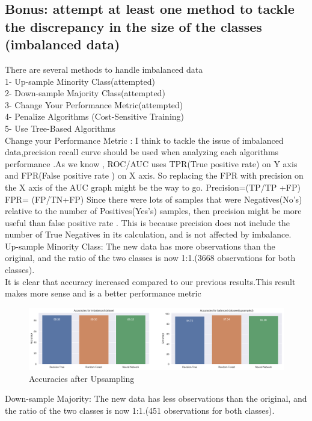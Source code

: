 \subsection{Bonus: attempt at least one method to tackle the discrepancy in the size of the classes (imbalanced data)}
There are several methods to handle imbalanced data\cite{ref_url2}\\
1- Up-sample Minority Class(attempted)\\
2- Down-sample Majority Class(attempted)\\
3- Change Your Performance Metric(attempted)\\
4- Penalize Algorithms (Cost-Sensitive Training)\\
5- Use Tree-Based Algorithms\\
Change your Performance Metric :
 I think to tackle the issue of imbalanced data,precision  recall curve should be used when analyzing each algorithms performance  .As we know , ROC/AUC uses TPR(True positive rate) on Y axis and FPR(False positive rate ) on X axis. So replacing the FPR with precision on the X axis of the AUC graph might be the way to go.
 Precision=(TP/TP +FP) FPR= (FP/TN+FP)
 Since there were lots of samples that were Negatives(No's) relative to the number of Positives(Yes's) samples, then precision might be more useful than false positive rate . This is because precision does not include the number of True Negatives in its calculation, and is not affected by imbalance.\\
 \newline
Up-sample Minority Class:
The new data has more observations than the original, and the ratio of the two classes is now 1:1.(3668 observations for both classes).\\
It is clear that accuracy increased compared to our previous results.This result makes more sense and is a better performance metric
\begin{figure}[!ht]
 \centering
\includegraphics[width=6.1in]{assignment2/1-7-barcharts_up.png}
\caption{\label{fig:fig5}Accuracies after Upsampling }
\end{figure}
\newline
Down-sample Majority:
The new data has less observations than the original, and the ratio of the two classes is now 1:1.(451 observations for both classes).\\
